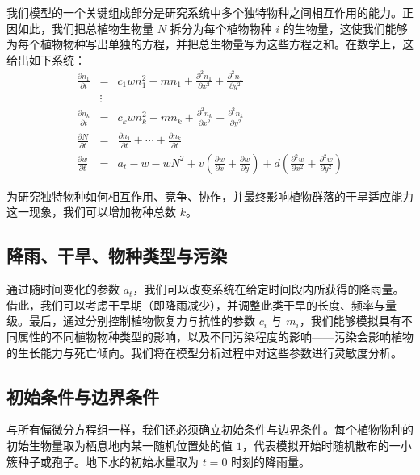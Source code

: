 \documentclass[11pt,a4paper]{ctexart}
\begin{document}
我们模型的一个关键组成部分是研究系统中多个独特物种之间相互作用的能力。正因如此，我们把总植物生物量 $N$ 拆分为每个植物物种 $i$ 的生物量，这使我们能够为每个植物物种写出单独的方程，并把总生物量写为这些方程之和。在数学上，这给出如下系统：
\begin{equation}
\begin{array}{rcl}
\frac{\partial n_1}{\partial t} & = & c_1 w n_1^2 - m n_1 + \frac{\partial^2 n_1}{\partial x^2} + \frac{\partial^2 n_1}{\partial y^2}\\[1.0em]
& \vdots & \\[0.4em]
\frac{\partial n_k}{\partial t} & = & c_k w n_k^2 - m n_k + \frac{\partial^2 n_k}{\partial x^2} + \frac{\partial^2 n_k}{\partial y^2}\\[1.0em]
\frac{\partial N}{\partial t} & = & \frac{\partial n_1}{\partial t} + \cdots + \frac{\partial n_k}{\partial t}\\[1.0em]
\frac{\partial w}{\partial t} & = & a_t - w - wN^2 + v\left(\frac{\partial w}{\partial x} + \frac{\partial w}{\partial y}\right) + d\left(\frac{\partial^2 w}{\partial x^2} + \frac{\partial^2 w}{\partial y^2}\right)
\end{array}
\end{equation}

为研究独特物种如何相互作用、竞争、协作，并最终影响植物群落的干旱适应能力这一现象，我们可以增加物种总数 $k$。

\subsection{降雨、干旱、物种类型与污染}

通过随时间变化的参数 $a_t$，我们可以改变系统在给定时间段内所获得的降雨量。借此，我们可以考虑干旱期（即降雨减少），并调整此类干旱的长度、频率与量级。最后，通过分别控制植物恢复力与抗性的参数 $c_i$ 与 $m_i$，我们能够模拟具有不同属性的不同植物物种类型的影响，以及不同污染程度的影响——污染会影响植物的生长能力与死亡倾向。我们将在模型分析过程中对这些参数进行灵敏度分析。

\subsection{初始条件与边界条件}

与所有偏微分方程组一样，我们还必须确立初始条件与边界条件。每个植物物种的初始生物量取为栖息地内某一随机位置处的值 $1$，代表模拟开始时随机散布的一小簇种子或孢子。地下水的初始水量取为 $t=0$ 时刻的降雨量。
\end{document}
